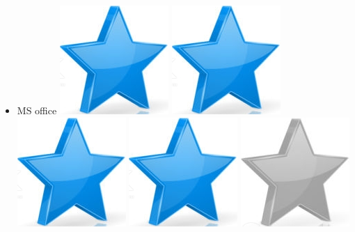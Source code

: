\documentclass[10pt,a4paper,sans]{article}
\begin{document}
\begin{minipage}[t]{0.28\textwidth}
\begin{mdframed}[style=cadreCompetences]
\begin{itemize}
                \item{MS office
                    \hfill
                    \includegraphics[scale=0.25]{img/star.png} \hspace{-0.22cm}
                    \includegraphics[scale=0.25]{img/star.png} \hspace{-0.22cm}
                    \includegraphics[scale=0.25]{img/star.png} \hspace{-0.22cm}
                    \includegraphics[scale=0.25]{img/star.png} \hspace{-0.22cm}
                    \includegraphics[scale=0.25]{img/empty_star.png}}

\end{itemize}
\end{mdframed}
\end{minipage}
\end{document}

